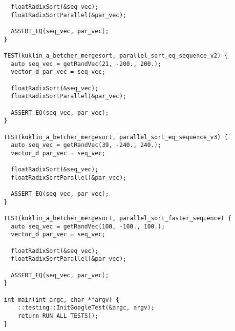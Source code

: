 \documentclass{report}
\begin{document}
\begin{lstlisting}
  floatRadixSort(&seq_vec);
  floatRadixSortParallel(&par_vec);

  ASSERT_EQ(seq_vec, par_vec);
}

TEST(kuklin_a_betcher_mergesort, parallel_sort_eq_sequence_v2) {
  auto seq_vec = getRandVec(21, -200., 200.);
  vector_d par_vec = seq_vec;

  floatRadixSort(&seq_vec);
  floatRadixSortParallel(&par_vec);

  ASSERT_EQ(seq_vec, par_vec);
}

TEST(kuklin_a_betcher_mergesort, parallel_sort_eq_sequence_v3) {
  auto seq_vec = getRandVec(39, -240., 240.);
  vector_d par_vec = seq_vec;

  floatRadixSort(&seq_vec);
  floatRadixSortParallel(&par_vec);

  ASSERT_EQ(seq_vec, par_vec);
}

TEST(kuklin_a_betcher_mergesort, parallel_sort_faster_sequence) {
  auto seq_vec = getRandVec(100, -100., 100.);
  vector_d par_vec = seq_vec;

  floatRadixSort(&seq_vec);
  floatRadixSortParallel(&par_vec);

  ASSERT_EQ(seq_vec, par_vec);
}

int main(int argc, char **argv) {
    ::testing::InitGoogleTest(&argc, argv);
    return RUN_ALL_TESTS();
}
\end{lstlisting}
\end{document}
